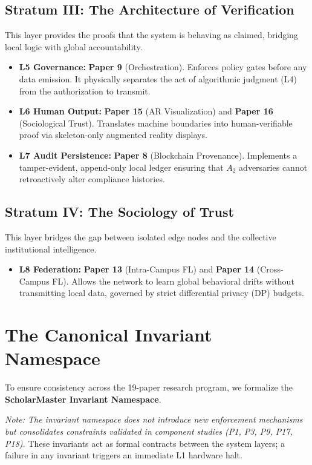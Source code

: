 \documentclass[conference]{IEEEtran}
\begin{document}
\subsection{Stratum III: The Architecture of Verification}
This layer provides the proofs that the system is behaving as claimed, bridging local logic with global accountability.
\begin{itemize}
    \item \textbf{L5 Governance:} \textbf{Paper 9} (Orchestration). Enforces policy gates before any data emission. It physically separates the act of algorithmic judgment (L4) from the authorization to transmit.
    \item \textbf{L6 Human Output:} \textbf{Paper 15} (AR Visualization) and \textbf{Paper 16} (Sociological Trust). Translates machine boundaries into human-verifiable proof via skeleton-only augmented reality displays.
    \item \textbf{L7 Audit Persistence:} \textbf{Paper 8} (Blockchain Provenance). Implements a tamper-evident, append-only local ledger ensuring that $A_2$ adversaries cannot retroactively alter compliance histories.
\end{itemize}

\subsection{Stratum IV: The Sociology of Trust}
This layer bridges the gap between isolated edge nodes and the collective institutional intelligence.
\begin{itemize}
    \item \textbf{L8 Federation:} \textbf{Paper 13} (Intra-Campus FL) and \textbf{Paper 14} (Cross-Campus FL). Allows the network to learn global behavioral drifts without transmitting local data, governed by strict differential privacy (DP) budgets.
\end{itemize}

\section{The Canonical Invariant Namespace}

To ensure consistency across the 19-paper research program, we formalize the \textbf{ScholarMaster Invariant Namespace}. 

\textit{Note: The invariant namespace does not introduce new enforcement mechanisms but consolidates constraints validated in component studies (P1, P3, P9, P17, P18).} These invariants act as formal contracts between the system layers; a failure in any invariant triggers an immediate L1 hardware halt.
\end{document}
